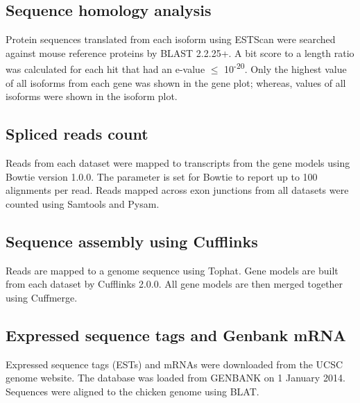 \documentclass[10pt]{article}
\begin{document}
\subsection*{Sequence homology analysis}

Protein sequences translated from each isoform using ESTScan were searched
against mouse reference proteins by BLAST 2.2.25+\cite{Tatusova:1999tz}.  A bit
score to a length ratio was calculated for each hit that had an e-value $\le$
10\textsuperscript{-20}.  Only the highest value of all isoforms from each gene
was shown in the gene plot; whereas, values of all isoforms were shown in the
isoform plot.

\subsection*{Spliced reads count}

Reads from each dataset were mapped to transcripts from the gene models using
Bowtie version 1.0.0. The parameter is set for Bowtie to report up to 100
alignments per read.  Reads mapped across exon junctions from all datasets were
counted using Samtools\cite{Li:2009vz} and Pysam\cite{pysam}.

\subsection*{Sequence assembly using Cufflinks}
Reads are mapped to a genome sequence using Tophat.  Gene models are built from
each dataset by Cufflinks 2.0.0\cite{Trapnell:2010kd}.  All gene models are
then merged together using Cuffmerge.

\subsection*{Expressed sequence tags and Genbank mRNA}
Expressed sequence tags (ESTs) and mRNAs were downloaded from the UCSC genome
website.  The database was loaded from GENBANK on 1 January 2014.  Sequences
were aligned to the chicken genome using BLAT.


\end{document}
